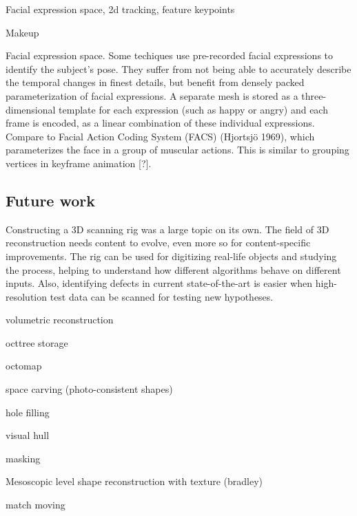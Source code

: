Facial expression space, 2d tracking, feature keypoints

Makeup

Facial expression space. Some techiques \cite{faceshift,something} use pre-recorded facial expressions to identify the subject's pose.
They suffer from not being able to accurately describe the temporal changes in finest details, but benefit from densely packed parameterization of facial expressions.
A separate mesh is stored as a three-dimensional template for each expression (such as happy or angry) and each frame is encoded, as a linear combination of these individual expressions.
%
Compare to Facial Action Coding System (FACS) (Hjortsjö 1969), which parameterizes the face in a group of muscular actions. This is similar to grouping vertices in keyframe animation [?].
%
%

\subsection{Future work}


Constructing a 3D scanning rig was a large topic on its own.
The field of 3D reconstruction needs content to evolve, even more so for content-specific improvements.
The rig can be used for digitizing real-life objects and studying the process, helping to understand how different algorithms behave on different inputs.
Also, identifying defects in current state-of-the-art is easier when high-resolution test data can be scanned for testing new hypotheses.


volumetric reconstruction

octtree storage

octomap

space carving (photo-consistent shapes)

hole filling

visual hull

masking

Mesoscopic level shape reconstruction with texture (bradley)

match moving
